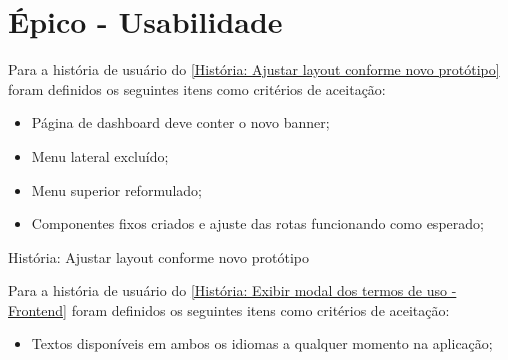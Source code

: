 \section{Épico - Usabilidade}
\label{gestão_usabilidade}
Para a história de usuário do \autoref{História: Ajustar layout conforme novo protótipo} foram definidos os seguintes itens como critérios de aceitação:

\begin{itemize}
\item Página de dashboard deve conter o novo banner;
\item Menu lateral excluído;
\item Menu superior reformulado;
\item Componentes fixos criados e ajuste das rotas funcionando como esperado;
\end{itemize}

\def\arraystretch{2}
\begin{quadro}[htb]
\centering
\ABNTEXfontereduzida
\caption[História: Ajustar layout conforme novo protótipo]{História: Ajustar layout conforme novo protótipo}
\label{História: Ajustar layout conforme novo protótipo}
\end{quadro}
\FloatBarrier 

Para a história de usuário do \autoref{História: Exibir modal dos termos de uso - Frontend} foram definidos os seguintes itens como critérios de aceitação:

\begin{itemize}
\item  Textos disponíveis em ambos os idiomas a qualquer momento na aplicação;
\end{itemize}

